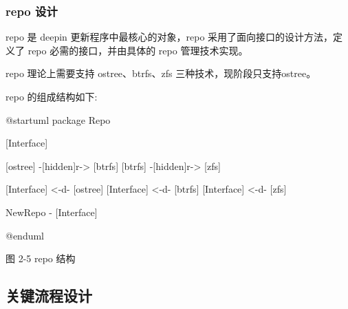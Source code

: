 \documentclass{utart}
\begin{document}
\subsubsection{repo 设计}
repo 是 deepin 更新程序中最核心的对象，repo 采用了面向接口的设计方法，定义了 repo 必需的接口，并由具体的 repo 管理技术实现。

repo 理论上需要支持 ostree、btrfs、zfs 三种技术，现阶段只支持ostree。

repo 的组成结构如下:
\begin{center}
  \begin{adjustbox}{scale=0.55}
    \begin{plantuml}
      @startuml
      package Repo {
        [Interface]

        [ostree] -[hidden]r-> [btrfs]
        [btrfs] -[hidden]r-> [zfs]

        [Interface] <-d- [ostree]
        [Interface] <-d- [btrfs]
        [Interface] <-d- [zfs]

        NewRepo - [Interface]
      }
      @enduml
    \end{plantuml}
  \end{adjustbox}

  图 2-5 repo 结构
\end{center}

\subsection{关键流程设计}
\end{document}
